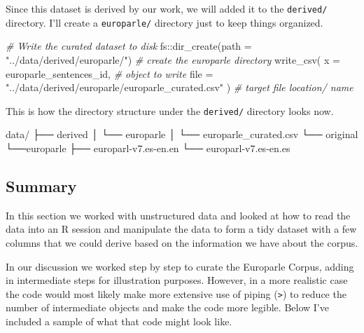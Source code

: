 \documentclass[
  letterpaper,
  DIV=11,
  numbers=noendperiod]{scrreport}
\newenvironment{Shaded}{\begin{snugshade}}{\end{snugshade}}
\newcommand{\AttributeTok}[1]{\textcolor[rgb]{0.00,0.00,0.00}{#1}}
\newcommand{\CommentTok}[1]{\textcolor[rgb]{0.00,0.00,0.00}{\textit{#1}}}
\newcommand{\ExtensionTok}[1]{\textcolor[rgb]{0.00,0.00,0.00}{#1}}
\newcommand{\FunctionTok}[1]{\textcolor[rgb]{0.00,0.00,0.00}{#1}}
\newcommand{\NormalTok}[1]{\textcolor[rgb]{0.00,0.00,0.00}{#1}}
\newcommand{\SpecialCharTok}[1]{\textcolor[rgb]{0.00,0.00,0.00}{#1}}
\newcommand{\StringTok}[1]{\textcolor[rgb]{0.00,0.00,0.00}{#1}}
\theoremstyle{definition}
\theoremstyle{remark}
\begin{document}
Since this dataset is derived by our work, we will added it to the
\texttt{derived/} directory. I'll create a \texttt{europarle/} directory
just to keep things organized.

\begin{Shaded}
\begin{Highlighting}[]
\CommentTok{\# Write the curated dataset to disk}
\NormalTok{fs}\SpecialCharTok{::}\FunctionTok{dir\_create}\NormalTok{(}\AttributeTok{path =} \StringTok{"../data/derived/europarle/"}\NormalTok{) }\CommentTok{\# create the europarle directory}
\FunctionTok{write\_csv}\NormalTok{(}
  \AttributeTok{x =}\NormalTok{ europarle\_sentences\_id, }\CommentTok{\# object to write}
  \AttributeTok{file =} \StringTok{"../data/derived/europarle/europarle\_curated.csv"}
\NormalTok{) }\CommentTok{\# target file location/ name}
\end{Highlighting}
\end{Shaded}

This is how the directory structure under the \texttt{derived/}
directory looks now.

\begin{Shaded}
\begin{Highlighting}[]
\ExtensionTok{data/}
\ExtensionTok{├──}\NormalTok{ derived}
\ExtensionTok{│}\NormalTok{   └── europarle}
\ExtensionTok{│}\NormalTok{       └── europarle\_curated.csv}
\ExtensionTok{└──}\NormalTok{ original}
    \ExtensionTok{└──europarle}
        \ExtensionTok{├──}\NormalTok{ europarl{-}v7.es{-}en.en}
        \ExtensionTok{└──}\NormalTok{ europarl{-}v7.es{-}en.es}
\end{Highlighting}
\end{Shaded}

\hypertarget{summary-5}{%
\subsection{Summary}\label{summary-5}}

In this section we worked with unstructured data and looked at how to
read the data into an R session and manipulate the data to form a tidy
dataset with a few columns that we could derive based on the information
we have about the corpus.

In our discussion we worked step by step to curate the Europarle Corpus,
adding in intermediate steps for illustration purposes. However, in a
more realistic case the code would most likely make more extensive use
of piping (\texttt{\textbar{}\textgreater{}}) to reduce the number of
intermediate objects and make the code more legible. Below I've included
a sample of what that code might look like.
\end{document}
